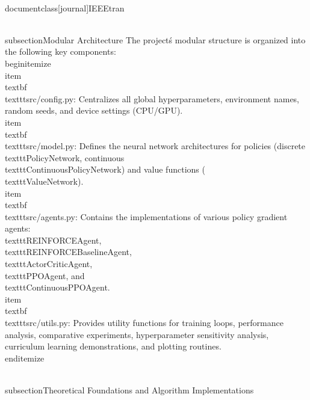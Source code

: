 \\documentclass[journal]{IEEEtran}
\begin{document}
\\subsection{Modular Architecture}
The project\'s modular structure is organized into the following key components:
\\begin{itemize}
    \\item \\textbf{\\texttt{src/config.py}}: Centralizes all global hyperparameters, environment names, random seeds, and device settings (CPU/GPU).
    \\item \\textbf{\\texttt{src/model.py}}: Defines the neural network architectures for policies (discrete \\texttt{PolicyNetwork}, continuous \\texttt{ContinuousPolicyNetwork}) and value functions (\\texttt{ValueNetwork}).
    \\item \\textbf{\\texttt{src/agents.py}}: Contains the implementations of various policy gradient agents: \\texttt{REINFORCEAgent}, \\texttt{REINFORCEBaselineAgent}, \\texttt{ActorCriticAgent}, \\texttt{PPOAgent}, and \\texttt{ContinuousPPOAgent}.
    \\item \\textbf{\\texttt{src/utils.py}}: Provides utility functions for training loops, performance analysis, comparative experiments, hyperparameter sensitivity analysis, curriculum learning demonstrations, and plotting routines.
\\end{itemize}

\\subsection{Theoretical Foundations and Algorithm Implementations}
\end{document}
